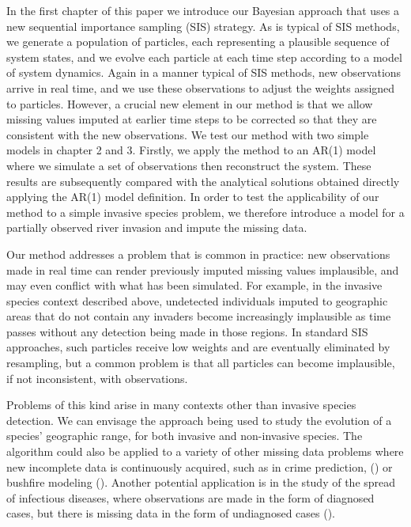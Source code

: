 In the first chapter of this paper we introduce our Bayesian approach that uses a new sequential importance sampling (SIS) strategy. As is typical of SIS methods, we generate a population of particles, each representing a plausible sequence of system states, and we evolve each particle at each time step according to a model of system dynamics. Again in a manner typical of SIS methods, new observations arrive in real time, and we use these observations to adjust the weights assigned to particles. However, a crucial new element in our method is that we allow missing values imputed at earlier time steps to be corrected so that they are consistent with the new observations. We test our method with two simple models in chapter 2 and 3. Firstly, we apply the method to an AR(1) model where we simulate a set of observations then reconstruct the system. These results are subsequently compared with the analytical solutions obtained directly applying the AR(1) model definition. In order to test the applicability of our method to a simple invasive species problem, we therefore introduce a model for a partially observed river invasion and impute the missing data.

Our method addresses a problem that is common in practice: new observations made in real time can render previously imputed missing values implausible, and may even conflict with what has been simulated. For example, in the invasive species context described above, undetected individuals imputed to geographic areas that do not contain any invaders become increasingly implausible as time passes without any detection being made in those regions. In standard SIS approaches, such particles receive low weights and are eventually eliminated by resampling, but a common problem is that all particles can become implausible, if not inconsistent, with observations.

Problems of this kind arise in many contexts other than invasive species detection. We can envisage the approach being used to study the evolution of a species' geographic range, for both invasive and non-invasive species. The algorithm could also be applied to a variety of other missing data problems where new incomplete data is continuously acquired, such as in crime prediction, (\cite{Malathy}) or bushfire modeling (\cite{Beer}). Another potential application is in the study of the spread of infectious diseases, where observations are made in the form of diagnosed cases, but there is missing data in the form of undiagnosed cases (\cite{O'Neill}). 

